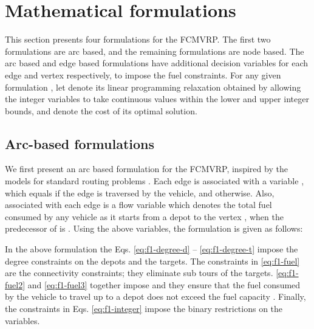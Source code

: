 \documentclass[letterpaper, 10pt, conference]{ieeeconf}
\begin{document}
\section{Mathematical formulations \label{sec:formulation}}
This section presents four formulations for the FCMVRP. The first two formulations are arc based, and the remaining formulations are node based. The arc based and edge based formulations have additional decision variables for each edge and vertex respectively, to impose the fuel constraints. 
For any given formulation , let  denote its linear programming relaxation obtained by allowing the integer variables to take continuous values within the lower and upper integer bounds, and  denote the cost of its optimal solution. 

\subsection{Arc-based formulations \label{subsec:arcbased}}
We first present an arc based formulation  for the FCMVRP, inspired by the models for standard routing problems \cite{Toth2001, Kara2011}. Each edge  is associated with a variable , which equals  if the edge  is traversed by the vehicle, and  otherwise. Also, associated with each edge  is a flow variable  which denotes the total fuel consumed by any vehicle as it starts from a depot to the vertex , when the predecessor of  is . Using the above variables, the formulation  is given as follows:

In the above formulation the Eqs. \eqref{eq:f1-degree-d} -- \eqref{eq:f1-degree-t} impose the degree constraints on the depots and the targets. The constraints in \eqref{eq:f1-fuel} are the connectivity constraints; they eliminate sub tours of the targets. \eqref{eq:f1-fuel2} and \eqref{eq:f1-fuel3} together impose  and they ensure that the fuel consumed by the vehicle to travel up to a depot does not exceed the fuel capacity . Finally, the constraints in Eqs. \eqref{eq:f1-integer} impose the binary restrictions on the variables.   
\end{document}
